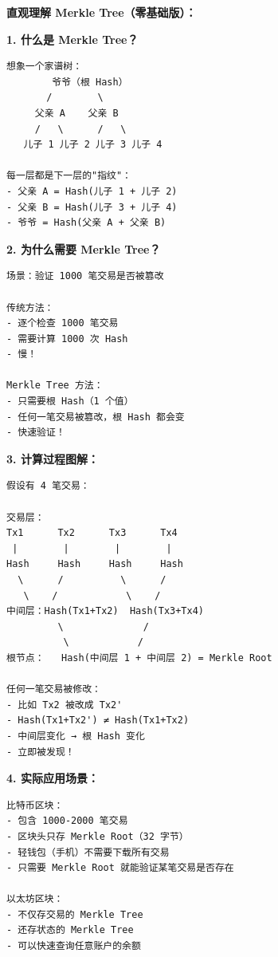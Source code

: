 \begin{theorybox}
\textbf{直观理解 Merkle Tree（零基础版）：}

\textbf{1. 什么是 Merkle Tree？}

\begin{lstlisting}
想象一个家谱树：
        爷爷（根 Hash）
       /        \
     父亲 A    父亲 B
     /   \      /   \
   儿子 1 儿子 2 儿子 3 儿子 4

每一层都是下一层的"指纹"：
- 父亲 A = Hash(儿子 1 + 儿子 2)
- 父亲 B = Hash(儿子 3 + 儿子 4)
- 爷爷 = Hash(父亲 A + 父亲 B)
\end{lstlisting}

\textbf{2. 为什么需要 Merkle Tree？}

\begin{lstlisting}
场景：验证 1000 笔交易是否被篡改

传统方法：
- 逐个检查 1000 笔交易
- 需要计算 1000 次 Hash
- 慢！

Merkle Tree 方法：
- 只需要根 Hash（1 个值）
- 任何一笔交易被篡改，根 Hash 都会变
- 快速验证！
\end{lstlisting}

\textbf{3. 计算过程图解：}

\begin{lstlisting}
假设有 4 笔交易：

交易层：
Tx1      Tx2      Tx3      Tx4
 |        |        |        |
Hash     Hash     Hash     Hash
  \      /          \      /
   \    /            \    /
中间层：Hash(Tx1+Tx2)  Hash(Tx3+Tx4)
         \              /
          \            /
根节点：   Hash(中间层 1 + 中间层 2) = Merkle Root

任何一笔交易被修改：
- 比如 Tx2 被改成 Tx2'
- Hash(Tx1+Tx2') ≠ Hash(Tx1+Tx2)
- 中间层变化 → 根 Hash 变化
- 立即被发现！
\end{lstlisting}

\textbf{4. 实际应用场景：}

\begin{lstlisting}
比特币区块：
- 包含 1000-2000 笔交易
- 区块头只存 Merkle Root（32 字节）
- 轻钱包（手机）不需要下载所有交易
- 只需要 Merkle Root 就能验证某笔交易是否存在

以太坊区块：
- 不仅存交易的 Merkle Tree
- 还存状态的 Merkle Tree
- 可以快速查询任意账户的余额
\end{lstlisting}
\end{theorybox}

